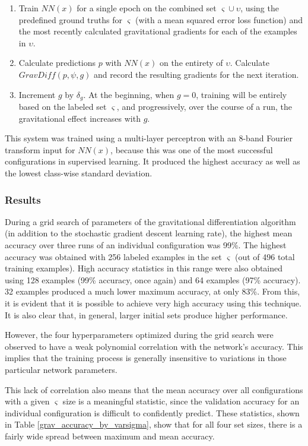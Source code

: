 \documentclass[10pt]{article}
\begin{document}
\begin{enumerate}
    \item Train $NN(x)$ for a single epoch on the combined set $\varsigma \cup \upsilon$, using the predefined ground truths for $\varsigma$ (with a mean squared error loss function) and the most recently calculated gravitational gradients for each of the examples in $\upsilon$.
    \item Calculate predictions $p$ with $NN(x)$ on the entirety of $\upsilon$. Calculate $GravDiff(p, \psi, g)$ and record the resulting gradients for the next iteration.
    \item Increment $g$ by $\delta_{g}$. At the beginning, when $g = 0$, training will be entirely based on the labeled set $\varsigma$, and progressively, over the course of a run, the gravitational effect increases with $g$.
\end{enumerate}

This system was trained using a multi-layer perceptron with an 8-band Fourier transform input for $NN(x)$, because this was one of the most successful configurations in supervised learning. It produced the highest accuracy as well as the lowest class-wise standard deviation.

\subsubsection{Results}

During a grid search of parameters of the gravitational differentiation algorithm (in addition to the stochastic gradient descent learning rate), the highest mean accuracy over three runs of an individual configuration was 99\%. The highest accuracy was obtained with 256 labeled examples in the set $\varsigma$ (out of 496 total training examples). High accuracy statistics in this range were also obtained using 128 examples (99\% accuracy, once again) and 64 examples (97\% accuracy). 32 examples produced a much lower maximum accuracy, at only 83\%. From this, it is evident that it is possible to achieve very high accuracy using this technique. It is also clear that, in general, larger initial sets produce higher performance.

However, the four hyperparameters optimized during the grid search were observed to have a weak polynomial correlation with the network's accuracy. This implies that the training process is generally insensitive to variations in those particular network parameters.

This lack of correlation also means that the mean accuracy over all configurations with a given $\varsigma$ size is a meaningful statistic, since the validation accuracy for an individual configuration is difficult to confidently predict. These statistics, shown in Table \ref{grav_accuracy_by_varsigma}, show that for all four set sizes, there is a fairly wide spread between maximum and mean accuracy.
\end{document}
